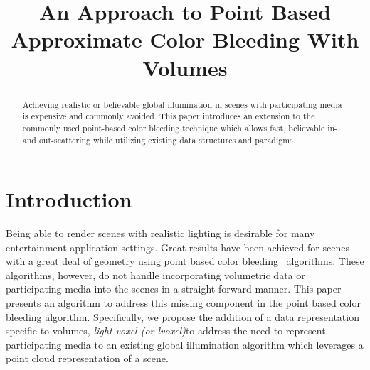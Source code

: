 \documentclass[runningheads]{llncs}
\begin{document}
\pagestyle{headings}



\mainmatter

\title{An Approach to Point Based Approximate Color Bleeding With Volumes}


\maketitle


\begin{abstract}
Achieving realistic or believable global illumination in scenes with participating media is expensive and commonly avoided.  This paper introduces an extension to the commonly used point-based color bleeding technique which allows fast, believable in- and out-scattering while utilizing existing data structures and paradigms.
\end{abstract}



\section{Introduction}
Being able to render scenes with realistic lighting is desirable for many entertainment application settings.  Great results have been achieved for scenes with a great deal of geometry using point based color bleeding~\cite{christensen:2008} algorithms.  These algorithms, however, do not handle incorporating volumetric data or participating media into the scenes in a straight forward manner.  This paper presents an algorithm to address this missing component in the point based color bleeding algorithm.  Specifically, we propose the addition of a data representation specific to volumes,  \emph{light-voxel (or lvoxel)}to address the need to represent participating media to an existing global illumination algorithm which leverages a point cloud representation of a scene.  
\end{document}
